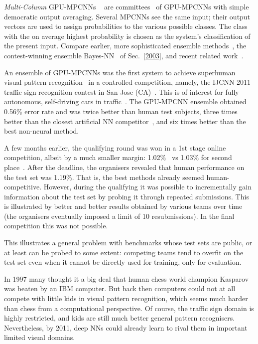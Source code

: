 \documentclass[letterpaper]{article}
\begin{document}
\begin{CJK*}{UTF8}{gbsn}
{\em Multi-Column} GPU-MPCNNs ~\citep{ciresan:2011ijcnn} 
are committees~\citep{breiman:1996,Schapire:90,wolpert:92stacked,hashem:1992,Ueda2000,dietterich2000} of GPU-MPCNNs  with simple democratic output averaging. 
Several MPCNNs see the same input; 
their output vectors are used to assign probabilities to the various possible classes. 
The class with the on average highest probability is chosen as the system's classification of the present input. 
Compare earlier, more sophisticated ensemble methods~\citep{Schapire:90},
the contest-winning ensemble Bayes-NN~\citep{neal2006b}
of Sec.~\ref{2003},
and recent related work~\citep{shao2014}.


An ensemble of GPU-MPCNNs was the first system to achieve
superhuman visual pattern recognition~\citep{ciresan:2011ijcnn,ciresan:2012NN} in a controlled competition, namely,
the IJCNN 2011 traffic sign recognition contest in San Jose (CA)~\citep{stallkamp:11,stallkamp:12}.
This is of interest for fully autonomous, self-driving cars in traffic~\citep[e.g.,][]{Dickmanns:94}.
The GPU-MPCNN ensemble obtained 0.56\% error rate and was twice better
 than human test subjects, 
three times better than the closest artificial NN competitor~\citep{sermanet-ijcnn-11}, and
six times better than the best non-neural method.

A few months earlier, the qualifying round was won in a 1st stage online competition, albeit by a much smaller margin: 1.02\%~\citep{ciresan:2011ijcnn} vs 1.03\% for second place~\citep{sermanet-ijcnn-11}. After the deadline, the organisers revealed that human performance on the test set was 1.19\%. That is, the best methods already seemed human-competitive. However, during the qualifying it was possible to incrementally gain information about the test set by probing it through repeated submissions. This is illustrated by better and better results obtained by various teams over time~\citep{stallkamp:12}
(the organisers eventually imposed a limit of 10 resubmissions). 
In the final competition this was not possible.

This illustrates a general problem with benchmarks whose test sets are public, or at least can be probed
to some extent: competing teams tend to overfit on the test set even when it 
cannot be directly used for training, only for evaluation.

In 1997 many thought it a big deal that human chess world champion Kasparov was beaten by an IBM computer. But back then computers could not at all compete with little kids in visual pattern recognition, which seems much harder than chess from a computational perspective. 
Of course, the traffic sign domain is highly restricted,
and kids are still much better general pattern recognisers.
Nevertheless, by 2011, deep NNs could
 already learn to rival them in important limited visual domains.


\end{CJK*}
\end{document}
